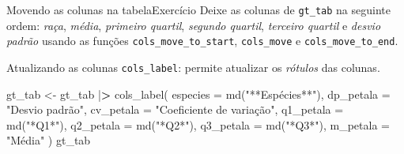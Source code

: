 \documentclass[
  10pt,
  ignorenonframetext,
]{beamer}
\newenvironment{Shaded}{}{}
\newcommand{\DataTypeTok}[1]{#1}
\newcommand{\ErrorTok}[1]{\textcolor[rgb]{1.00,0.00,0.00}{\textbf{#1}}}
\newcommand{\KeywordTok}[1]{\textcolor[rgb]{0.00,0.00,1.00}{#1}}
\newcommand{\NormalTok}[1]{#1}
\newcommand{\OperatorTok}[1]{#1}
\newcommand{\StringTok}[1]{\textcolor[rgb]{0.00,0.50,0.50}{#1}}
\begin{document}
\begin{frame}[fragile]{Movendo as colunas na tabela\newline Exercício}
\protect\hypertarget{movendo-as-colunas-na-tabelaexercuxedcio}{}
Deixe as colunas de \texttt{gt\_tab} na seguinte ordem: \emph{raça},
\emph{média}, \emph{primeiro quartil}, \emph{segundo quartil},
\emph{terceiro quartil} e \emph{desvio padrão} usando as funções
\texttt{cols\_move\_to\_start}, \texttt{cols\_move} e
\texttt{cols\_move\_to\_end}.
\end{frame}

\begin{frame}[fragile]{Atualizando as colunas}
\protect\hypertarget{atualizando-as-colunas}{}
\texttt{cols\_label}: permite atualizar os \emph{rótulos} das colunas.

\begin{Shaded}
\begin{Highlighting}[]
\NormalTok{gt\_tab \textless{}{-}}\StringTok{ }\NormalTok{gt\_tab }\OperatorTok{|}\ErrorTok{\textgreater{}}
\StringTok{  }\KeywordTok{cols\_label}\NormalTok{(}
    \DataTypeTok{especies =} \KeywordTok{md}\NormalTok{(}\StringTok{"**Espécies**"}\NormalTok{),}
    \DataTypeTok{dp\_petala =} \StringTok{"Desvio padrão"}\NormalTok{,}
    \DataTypeTok{cv\_petala =} \StringTok{"Coeficiente de variação"}\NormalTok{,}
    \DataTypeTok{q1\_petala =} \KeywordTok{md}\NormalTok{(}\StringTok{"*Q1*"}\NormalTok{),}
    \DataTypeTok{q2\_petala =} \KeywordTok{md}\NormalTok{(}\StringTok{"*Q2*"}\NormalTok{),}
    \DataTypeTok{q3\_petala =} \KeywordTok{md}\NormalTok{(}\StringTok{"*Q3*"}\NormalTok{),}
    \DataTypeTok{m\_petala =} \StringTok{"Média"}
\NormalTok{  )}
\NormalTok{gt\_tab}
\end{Highlighting}
\end{Shaded}
\end{frame}
\end{document}
